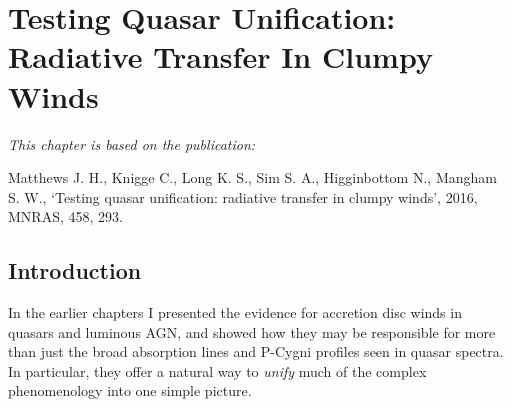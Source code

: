 \chapter{Testing Quasar Unification: Radiative Transfer In Clumpy Winds}


{\em This chapter is based on the publication:

Matthews J. H., Knigge C., Long K. S., Sim S. A., Higginbottom N., Mangham S. W., 
`Testing quasar unification: radiative transfer in clumpy winds',
2016, MNRAS, 458, 293.}


%
%
\def\py{\textsc{Python}}
\def\tar{\textsc{Tardis}}
\def\cld{\textsc{Cloudy}}
\def\agn{\textsc{Agnspec}}


\def\civ{C~\textsc{iv}}
\def\nv{N~\textsc{v}}
\def\hei{He~\textsc{i}}
\def\heii{He~\textsc{ii}}
\def\heiiline{He~\textsc{ii}~$4686$\AA}
\def\mg{Mg~\textsc{ii}}
\def\al{Al~\textsc{iii}}
\def\heii{He~\textsc{ii}}
\def\ovi{O~\textsc{vi}}
\def\la{Ly~$\alpha$}
\def\ha{H$\alpha$}
\def\hb{H$\beta$}
\def\civline{C~\textsc{iv}~$1550$\AA}
\def\nvline{N~\textsc{v}~$1240$\AA}
\def\mgline{Mg~\textsc{ii}~$2800$\AA}


\def\araa{ARAA}
\def\nat{Nature}
\def\apjl{ApJ Letters}
\def\aapr{AAPR}
\def\ssr{SSR}
\def\apj{ApJ}
\def\apjs{ApJs}
\def\pasp{PASP}
\def\aap{A\&A}
\def\mnras{MNRAS}
\def\aj{AJ}
\def\rmxaa{RMXAA}
\def\aaps{A\&As}
\def\LA{Lyman\thinspace$\alpha$}

\newcommand{\EXPN}[2]{\mbox{$#1\times 10^{#2}$}}
\newcommand{\EXPU}[3]{\mbox{\rm $#1 \times 10^{#2} \rm\:#3$}}  %
\newcommand{\POW}[2]{\mbox{$\rm10^{#1}\rm\:#2$}}
\def\LUM{\:{\rm erg\:s^{-1}}}
\def\FLUX{\:{\rm erg\:cm^{-2}\:s^{-1}}}
\def\OIGS{\:{\rm erg\:cm^{-2}\:s^{-1}\:\AA^{-1}}}

\section{Introduction}

In the earlier chapters I presented the evidence for accretion disc
winds in quasars and luminous AGN, and showed how they may be responsible
for more than just the broad absorption lines and P-Cygni profiles
seen in quasar spectra. In particular, they offer a natural way to
{\em unify} much of the complex phenomenology into one simple picture.


